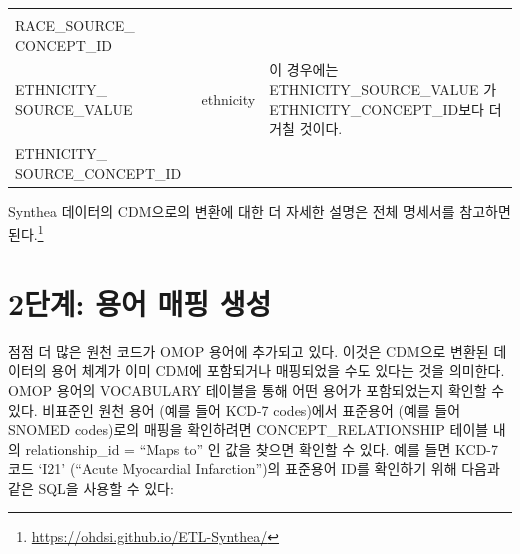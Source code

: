 \documentclass[10.5pt]{book}
\let\rmarkdownfootnote\footnote%
\def\footnote{\protect\rmarkdownfootnote}
\theoremstyle{definition}
\theoremstyle{definition}
\theoremstyle{definition}
\theoremstyle{remark}
\begin{document}
\begin{longtable}[]{@{}lll@{}}
\begin{minipage}[t]{0.50\columnwidth}
\strut
\end{minipage}\tabularnewline
\begin{minipage}[t]{0.28\columnwidth}\raggedright\strut
RACE\_SOURCE\_ CONCEPT\_ID\strut
\end{minipage} & \begin{minipage}[t]{0.13\columnwidth}\raggedright\strut
\strut
\end{minipage} & \begin{minipage}[t]{0.50\columnwidth}\raggedright\strut
\strut
\end{minipage}\tabularnewline
\begin{minipage}[t]{0.28\columnwidth}\raggedright\strut
ETHNICITY\_ SOURCE\_VALUE\strut
\end{minipage} & \begin{minipage}[t]{0.13\columnwidth}\raggedright\strut
ethnicity\strut
\end{minipage} & \begin{minipage}[t]{0.50\columnwidth}\raggedright\strut
이 경우에는 ETHNICITY\_SOURCE\_VALUE 가 ETHNICITY\_CONCEPT\_ID보다 더
거칠 것이다.\strut
\end{minipage}\tabularnewline
\begin{minipage}[t]{0.28\columnwidth}\raggedright\strut
ETHNICITY\_ SOURCE\_CONCEPT\_ID\strut
\end{minipage} & \begin{minipage}[t]{0.13\columnwidth}\raggedright\strut
\strut
\end{minipage} & \begin{minipage}[t]{0.50\columnwidth}\raggedright\strut
\strut
\end{minipage}\tabularnewline
\bottomrule
\end{longtable}

Synthea 데이터의 CDM으로의 변환에 대한 더 자세한 설명은 전체 명세서를
참고하면 된다.\footnote{\url{https://ohdsi.github.io/ETL-Synthea/}}

\section{2단계: 용어 매핑 생성}\label{---}

점점 더 많은 원천 코드가 OMOP 용어에 추가되고 있다. 이것은 CDM으로
변환된 데이터의 용어 체계가 이미 CDM에 포함되거나 매핑되었을 수도 있다는
것을 의미한다. OMOP 용어의 VOCABULARY 테이블을 통해 어떤 용어가
포함되었는지 확인할 수 있다. 비표준인 원천 용어 (예를 들어 KCD-7
codes)에서 표준용어 (예를 들어 SNOMED codes)로의 매핑을 확인하려면
CONCEPT\_RELATIONSHIP 테이블 내의 relationship\_id = ``Maps to'' 인 값을
찾으면 확인할 수 있다. 예를 들면 KCD-7 코드 `I21' (``Acute Myocardial
Infarction'')의 표준용어 ID를 확인하기 위해 다음과 같은 SQL을 사용할 수
있다:
\end{document}
